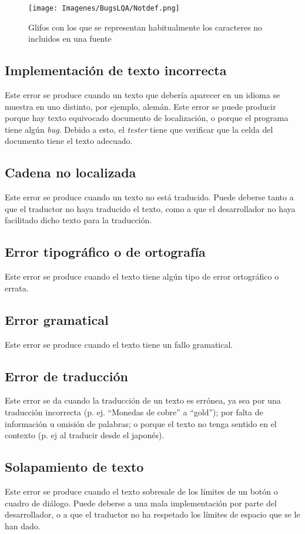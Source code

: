 \begin{figure}[H]

	\centering
	\texttt{[image: Imagenes/BugsLQA/Notdef.png]}
	\caption{Glifos con los que se representan habitualmente los caracteres no incluidos en una fuente}
	\label{Notdef}
\end{figure}
	
\subsection{Implementación de texto incorrecta}\label{ErrorImpIncorrecta}
Este error se produce cuando un texto que debería aparecer en un idioma se muestra en uno distinto, por ejemplo, alemán. Este error se puede producir porque hay texto equivocado documento de localización, o porque el programa tiene algún \textit{bug}. Debido a esto, el \textit{tester} tiene que verificar que la celda del documento tiene el texto adecuado.  
\subsection{Cadena no localizada}\label{ErrorNoLocalizada}
Este error se produce cuando un texto no está traducido. Puede deberse tanto a que el traductor no haya traducido el texto, como a que el desarrollador no haya facilitado dicho texto para la traducción. 
\subsection{Error tipográfico o de ortografía}\label{ErrorTypo}
Este error se produce cuando el texto tiene algún tipo de error ortográfico o errata.

\subsection{Error gramatical}\label{ErrorGramatical}
Este error se produce cuando el texto tiene un fallo gramatical.

\subsection{Error de traducción}\label{ErrorTraducción}
Este error se da cuando la traducción de un texto es errónea, ya sea por una traducción incorrecta (p. ej. ``Monedas de cobre'' a ``gold''); por falta de información u omisión de palabras; o porque el texto no tenga sentido en el contexto (p. ej al traducir desde el japonés).

\subsection{Solapamiento de texto}\label{ErrorSolapamiento}
Este error se produce cuando el texto sobresale de los límites de un botón o cuadro de diálogo. Puede deberse a una mala implementación por parte del desarrollador, o a que el traductor no ha respetado los límites de espacio que se le han dado.

